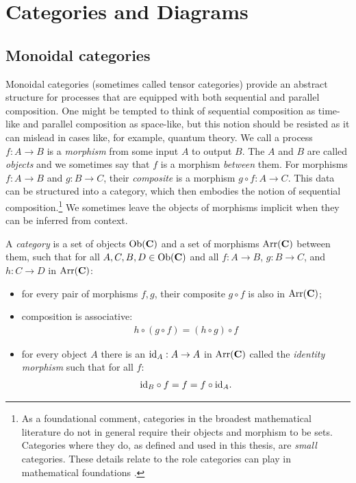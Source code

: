 \chapter{Categories and Diagrams}
\label{chap:cats}

\section{Monoidal categories}
Monoidal categories (sometimes called tensor categories) provide an abstract structure for processes that are equipped with both sequential and parallel composition. One might be tempted to think of sequential composition as time-like and parallel composition as space-like, but this notion should be resisted as it can mislead in cases like, for example, quantum theory.  We call a process $f:A\to B$ is a \emph{morphism} from some input $A$ to output $B$. The $A$ and $B$ are called \emph{objects} and we sometimes say that $f$ is a morphism \emph{between} them. For morphisms $f:A\to B$ and $g:B\to C$, their \emph{composite} is a morphism $g\circ f:A\to C$. This data can be structured into a category, which then embodies the notion of sequential composition.\footnote{As a foundational comment, categories in the broadest mathematical literature do not in general require their objects and morphism to be sets. Categories where they do, as defined and used in this thesis, are \emph{small} categories. These details relate to the role categories can play in mathematical foundations \cite{mac1969one}.} We sometimes leave the objects of morphisms implicit when they can be inferred from context.

\begin{defn}
A \emph{category}  is a set of objects $\mbox{Ob}(\mathbf{C})$ and a set of morphisms $\mbox{Arr}(\mathbf{C})$ between them, such that for all $A,C,B,D\in \mbox{Ob}(\mathbf{C})$ and all $f:A\to B$, $g:B\to C$, and $h:C\to D$ in $\mbox{Arr}(\mathbf{C})$:
\begin{itemize}
\item for every pair of morphisms $f,g$, their composite $g\circ f$ is also in $\mbox{Arr}(\mathbf{C})$;
\item composition is associative:
\begin{align}
h\circ(g\circ f) = (h\circ g)\circ f
\end{align}
\item for every object $A$ there is an $\mbox{id}_{A}:A\to A$ in $\mbox{Arr}(\mathbf{C})$ called the \emph{identity morphism} such that for all $f$:
\begin{align}
\mbox{id}_{B}\circ f = f = f\circ\mbox{id}_{A}.
\end{align}
\end{itemize}
\end{defn}


